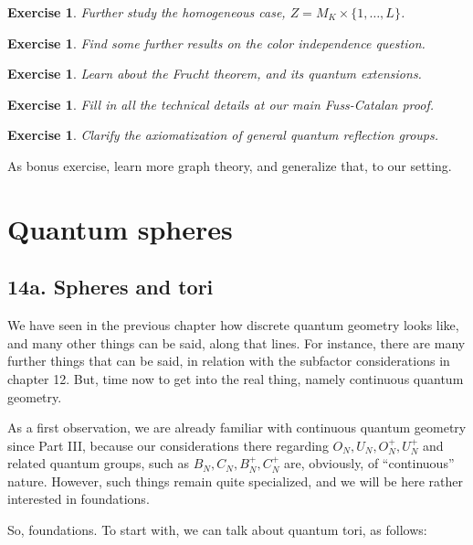 \documentclass[12pt]{amsbook}
\newtheorem{exercise}[theorem]{Exercise}
\begin{document}
\begin{exercise}
Further study the homogeneous case, $Z=M_K\times\{1,\ldots,L\}$.
\end{exercise}

\begin{exercise}
Find some further results on the color independence question.
\end{exercise}

\begin{exercise}
Learn about the Frucht theorem, and its quantum extensions.
\end{exercise}

\begin{exercise}
Fill in all the technical details at our main Fuss-Catalan proof.
\end{exercise}

\begin{exercise}
Clarify the axiomatization of general quantum reflection groups.
\end{exercise}

As bonus exercise, learn more graph theory, and generalize that, to our setting.

\chapter{Quantum spheres}

\section*{14a. Spheres and tori}

We have seen in the previous chapter how discrete quantum geometry looks like, and many other things can be said, along that lines. For instance, there are many further things that can be said, in relation with the subfactor considerations in chapter 12. But, time now to get into the real thing, namely continuous quantum geometry. 

\bigskip

As a first observation, we are already familiar with continuous quantum geometry since Part III, because our considerations there regarding $O_N,U_N,O_N^+,U_N^+$ and related quantum groups, such as $B_N,C_N,B_N^+,C_N^+$ are, obviously, of ``continuous'' nature. However, such things remain quite specialized, and we will be here rather interested in foundations.

\bigskip

So, foundations. To start with, we can talk about quantum tori, as follows:
\end{document}
